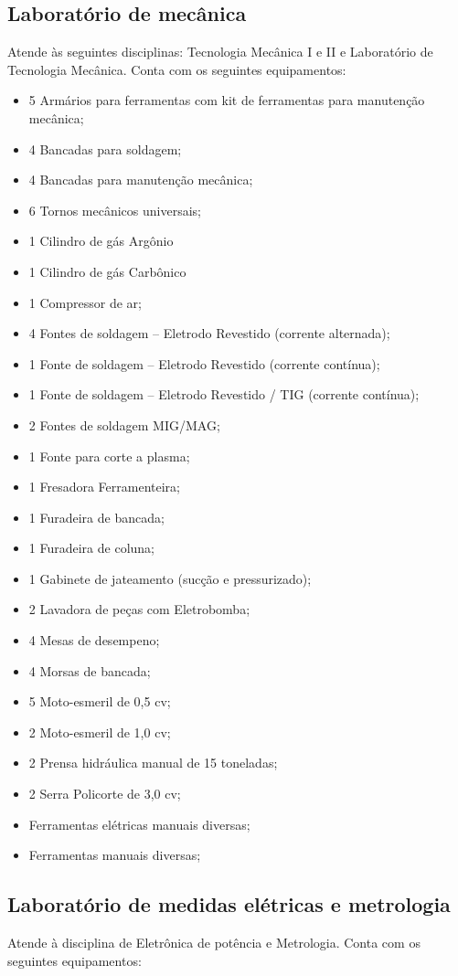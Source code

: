 \subsection{Laboratório de mecânica}
Atende às seguintes disciplinas: Tecnologia Mecânica I e II e Laboratório de Tecnologia Mecânica. Conta com os seguintes equipamentos:

\begin{itemize}
\item 5 Armários para ferramentas com kit de ferramentas para manutenção mecânica;
\item 4 Bancadas para soldagem;
\item 4 Bancadas para manutenção mecânica;
\item 6 Tornos mecânicos universais;
\item 1 Cilindro de gás Argônio
\item 1 Cilindro de gás Carbônico
\item 1 Compressor de ar;
\item 4 Fontes de soldagem – Eletrodo Revestido (corrente alternada);
\item 1 Fonte de soldagem – Eletrodo Revestido (corrente contínua);
\item 1 Fonte de soldagem – Eletrodo Revestido / TIG (corrente contínua);
\item 2 Fontes de soldagem MIG/MAG;
\item 1 Fonte para corte a plasma;
\item 1 Fresadora Ferramenteira;
\item 1 Furadeira de bancada;
\item 1 Furadeira de coluna;
\item 1 Gabinete de jateamento (sucção e pressurizado);
\item 2 Lavadora de peças com Eletrobomba;
\item 4 Mesas de desempeno;
\item 4 Morsas de bancada;
\item 5 Moto-esmeril de 0,5 cv;
\item 2 Moto-esmeril de 1,0 cv;
\item 2 Prensa hidráulica manual de 15 toneladas;
\item 2 Serra Policorte de 3,0 cv;
\item Ferramentas elétricas manuais diversas;
\item Ferramentas manuais diversas;
\end{itemize}

\subsection{Laboratório de medidas elétricas e metrologia}
Atende à disciplina de Eletrônica de potência e Metrologia. Conta com os seguintes equipamentos:

